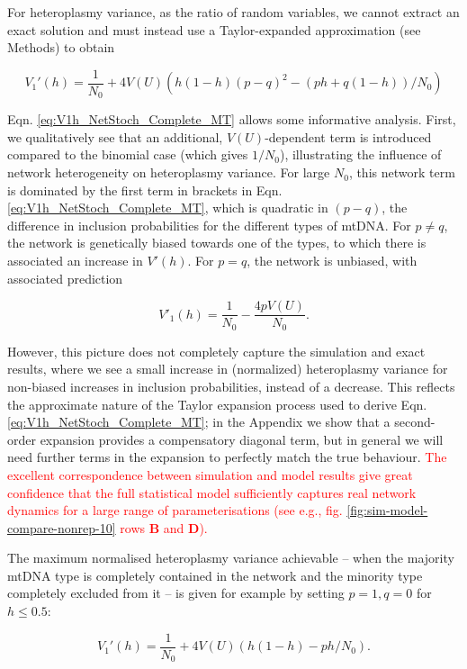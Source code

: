 \documentclass{article}
\newcommand{\be}{\begin{equation}}
\newcommand{\ee}{\end{equation}}
\begin{document}
For heteroplasmy variance, as the ratio of random variables, we cannot extract an exact solution and must instead use a Taylor-expanded approximation (see Methods) to obtain 

\be\label{eq:V1h_NetStoch_Complete_MT}
    V_1'(h)=\frac{1}{N_0} + 4 V(U) \left( h(1-h) (p-q)^2 - (p h + q(1-h))/N_0 \right)
    \ee

Eqn. \ref{eq:V1h_NetStoch_Complete_MT} allows some informative analysis. First, we qualitatively see that an additional, $V(U)$-dependent term is introduced compared to the binomial case (which gives $1/N_0$), illustrating the influence of network heterogeneity on heteroplasmy variance. For large $N_0$, this network term is dominated by the first term in brackets in Eqn. \ref{eq:V1h_NetStoch_Complete_MT}, which is quadratic in $(p-q)$, the difference in inclusion probabilities for the different types of mtDNA. For $p\neq q$, the network is genetically biased towards one of the types, to which there is associated an increase in $V'(h)$. For $p=q$, the network is unbiased, with associated prediction

\begin{equation}
V'_1(h) = \frac{1}{N_0} - \frac{4 p V(U)}{N_0}.
\end{equation}

However, this picture does not completely capture the simulation and exact results, where we see a small increase in (normalized) heteroplasmy variance for non-biased increases in inclusion probabilities, instead of a decrease. This reflects the approximate nature of the Taylor expansion process used to derive Eqn. \ref{eq:V1h_NetStoch_Complete_MT}; in the Appendix we show that a second-order expansion provides a compensatory diagonal term, but in general we will need further terms in the expansion to perfectly match the true behaviour. \textcolor{red}{The excellent correspondence between simulation and model results give great confidence that the full statistical model sufficiently captures real network dynamics for a large range of parameterisations (see e.g., fig. \ref{fig:sim-model-compare-nonrep-10} rows \textbf{B} and \textbf{D}).}

The maximum normalised heteroplasmy variance achievable -- when the majority mtDNA type is completely contained in the network and the minority type completely excluded from it -- is given for example by setting $p = 1, q= 0$ for $h \leq 0.5$:

\begin{equation}\label{eq:max-vh-no-repel-epsilon}
   V_1'(h)=\frac{1}{N_0} + 4 V(U) \left( h(1-h) - p h/N_0 \right).
\end{equation}
\end{document}
